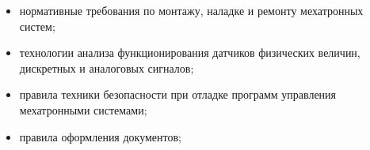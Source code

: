 \begin{itemize}
    \item нормативные требования по монтажу, наладке и ремонту мехатронных систем;
    \item технологии анализа функционирования датчиков физических величин, дискретных и аналоговых сигналов;
    \item правила техники безопасности при отладке программ управления мехатронными системами;
    \item правила оформления документов;
\end{itemize}